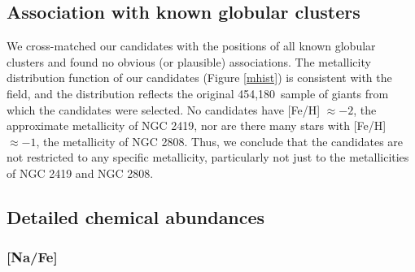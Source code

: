 \documentclass[a4paper,fleqn,usenatbib]{mnras}
\newcommand{\LamostGiants}{454,180}
\begin{document}
\subsection{Association with known globular clusters}
\label{sec:globclustasoc}
We cross-matched our candidates with the positions of all known globular clusters \citep{harris1996} and found no obvious (or plausible) associations. The metallicity distribution function of our candidates (Figure \ref{mhist}) is consistent with the field, and the distribution reflects the original \LamostGiants\ sample of giants from which the candidates were selected.
No candidates have [Fe/H] $\approx -2$, the approximate metallicity of NGC 2419, nor are there many stars with [Fe/H] $\approx -1$, the metallicity of NGC 2808. Thus, we conclude that the candidates are not restricted to any specific metallicity, particularly not just to the metallicities of NGC 2419 and NGC 2808.


\subsection{Detailed chemical abundances}
\label{sec:abundances}

\subsubsection{[Na/Fe]}
\end{document}
